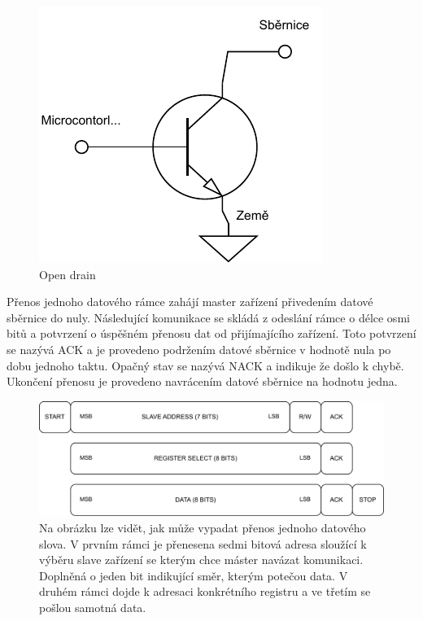 \begin{figure}[h!]
	\centering
	\includegraphics[scale=0.75]{obrazky-figures/open_drain.pdf}
	\caption{Open drain}
	\label{}
\end{figure}

Přenos jednoho datového rámce zahájí master zařízení přivedením datové sběrnice do nuly. Následující komunikace se skládá z odeslání rámce o délce osmi bitů a potvrzení o úspěšném přenosu dat od přijímajícího zařízení. Toto potvrzení se nazývá ACK a je provedeno podržením datové sběrnice v hodnotě nula po dobu jednoho taktu. Opačný stav se nazývá NACK a indikuje že došlo k chybě. Ukončení přenosu je provedeno navrácením datové sběrnice na hodnotu jedna.

\begin{figure}[h!]
	\centering
	\includegraphics[scale=0.75]{obrazky-figures/i2c_data_word.pdf}
	\caption{Na obrázku lze vidět, jak může vypadat přenos jednoho datového slova. V prvním rámci je přenesena sedmi bitová adresa sloužící k výběru slave zařízení se kterým chce máster navázat komunikaci. Doplněná o jeden bit indikující směr, kterým potečou data. V druhém rámci dojde k adresaci konkrétního registru a ve třetím se pošlou samotná data. \cite{an4481}}
	\label{}
\end{figure}

